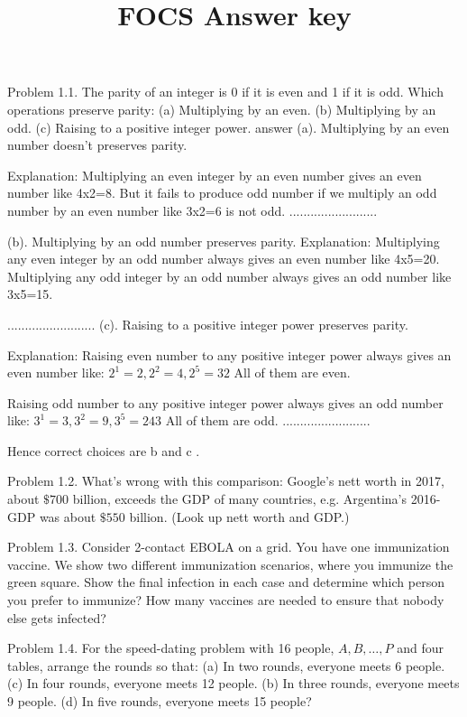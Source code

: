 \documentclass[10pt]{article}
\title{FOCS Answer key }
\author{}
\date{}
\begin{document}
\maketitle
Problem 1.1. The parity of an integer is 0 if it is even and 1 if it is odd. Which operations preserve parity:
(a) Multiplying by an even.
(b) Multiplying by an odd.
(c) Raising to a positive integer power.
answer
(a). Multiplying by an even number doesn't preserves parity.

Explanation:
Multiplying an even integer by an even number gives an even number like 4x2=8. But it fails to produce odd number if we multiply an odd number by an even number like 3x2=6 is not odd.
.........................

(b). Multiplying by an odd number preserves parity. Explanation: Multiplying any even integer by an odd number always gives an even number like 4x5=20.
Multiplying any odd integer by an odd number always gives an odd number like 3x5=15.

.........................
(c). Raising to a positive integer power preserves parity.

Explanation: Raising even number to any positive integer power always gives an even number like:
$2^1=2, 2^2=4, 2^5=32$
All of them are even.

Raising odd number to any positive integer power always gives an odd number like:
$3^1=3, 3^2=9, 3^5=243$
All of them are odd.
.........................

Hence correct choices are b and c .


Problem 1.2. What's wrong with this comparison: Google's nett worth in 2017, about $\$ 700$ billion, exceeds the GDP of many countries, e.g. Argentina's 2016-GDP was about $\$ 550$ billion. (Look up nett worth and GDP.)

Problem 1.3. Consider 2-contact EBOLA on a grid. You have one immunization vaccine. We show two different immunization scenarios, where you immunize the green square. Show the final infection in each case and determine which person you prefer to immunize? How many vaccines are needed to ensure that nobody else gets infected?

Problem 1.4. For the speed-dating problem with 16 people, $A, B, \ldots, P$ and four tables, arrange the rounds so that:
(a) In two rounds, everyone meets 6 people.
(c) In four rounds, everyone meets 12 people.
(b) In three rounds, everyone meets 9 people.
(d) In five rounds, everyone meets 15 people?
\end{document}
